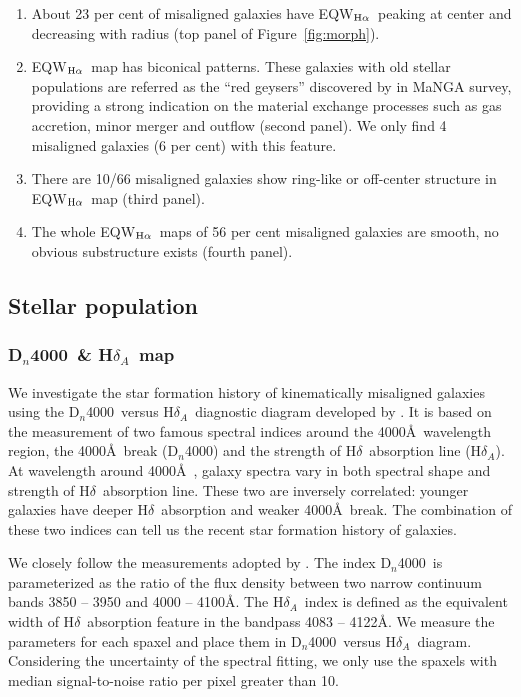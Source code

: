 \documentclass[a4paper,fleqn,usenatbib]{mnras}
\newcommand{\dindex}{D$_n$4000}
\newcommand{\hd}{H$\delta$}
\newcommand{\hda}{\hd$_A$}
\newcommand{\ewhae}{\rm{EQW$_{\rm H\alpha}$}}
\begin{document}
\begin{enumerate}[(1)]
\item About 23 per cent of misaligned galaxies have \ewhae\ peaking at center and decreasing with radius (top panel of Figure~\ref{fig:morph}).
\item \ewhae\ map has biconical patterns. These galaxies with old stellar populations are referred as the ``red geysers'' discovered by %
\cite{cheung-2016} in MaNGA survey, providing a strong indication on the material exchange processes such as gas accretion, minor merger and outflow (second panel). We only find 4 misaligned galaxies (6 per cent) with this feature.
\item There are 10/66 misaligned galaxies show ring-like or off-center structure in \ewhae\ map (third panel).
\item The whole \ewhae\ maps of 56 per cent misaligned galaxies are smooth, no obvious substructure exists (fourth panel).
\end{enumerate}


\subsection{Stellar population} \label{sec: sfh}
\subsubsection{\dindex\ \& \hda\ map}

We investigate the star formation history of kinematically misaligned galaxies 
using the \dindex\ versus \hda\ diagnostic diagram developed by 
\cite{kauffmann-2003b}. It is based on the measurement of two famous 
spectral indices around the 4000\AA\ wavelength region, the 4000\AA\ 
break (\dindex) and the strength of \hd\ absorption line (\hda). 
At wavelength around 4000\AA\ , galaxy spectra vary in both spectral 
shape and strength of \hd\ absorption line. These two are inversely 
correlated: younger galaxies have deeper \hd\ absorption and weaker 
4000\AA\ break. The combination of these two indices can tell us 
the recent star formation history of galaxies. 

We closely follow the measurements adopted by \cite{kauffmann-2003b}. 
The index \dindex\ is parameterized as the ratio of the flux density 
between two narrow continuum bands 3850 -- 3950 and 4000 -- 4100\AA. 
The \hda\ index is defined as the equivalent width of \hd\ absorption 
feature in the bandpass 4083 -- 4122\AA. We measure the parameters 
for each spaxel and place them in \dindex\ versus \hda\ diagram. 
Considering the uncertainty of the spectral fitting, we only use 
the spaxels with median signal-to-noise ratio per pixel greater than 10.
\end{document}
